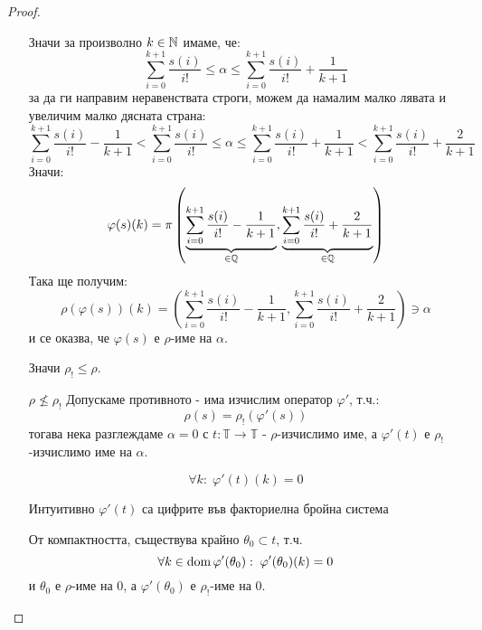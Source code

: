 \begin{proof}
\begin{itemize}
        Значи за произволно $k \in {\mathbb{N}}$ имаме, че:
        \begin{equation}
            \sum\limits_{i=0}^{k+1} \frac{s(i)}{i!} \leq \alpha \leq \sum\limits_{i=0}^{k+1} \frac{s(i)}{i!} + \frac{1}{k+1}
        \end{equation}
        за да ги направим неравенствата строги, можем да намалим малко лявата и увеличим малко дясната страна:
        \begin{equation}
            \sum\limits_{i=0}^{k+1} \frac{s(i)}{i!} - \frac{1}{k+1} < \sum\limits_{i=0}^{k+1} \frac{s(i)}{i!} \leq \alpha \leq \sum\limits_{i=0}^{k+1} \frac{s(i)}{i!} + \frac{1}{k+1} < \sum\limits_{i=0}^{k+1} \frac{s(i)}{i!} + \frac{2}{k+1}
        \end{equation}
        Значи:
        \begin{equation}
            \varphi(s)(k) = \pi\left(\underbrace{\sum\limits_{i=0}^{k+1} \frac{s(i)}{i!} - \frac{1}{k+1}}_{\in {\mathbb{Q}}}, \underbrace{\sum\limits_{i=0}^{k+1} \frac{s(i)}{i!} + \frac{2}{k+1}}_{\in{\mathbb{Q}}}\right)
        \end{equation}
        Така ще получим:
        \begin{equation}
            \rho(\varphi(s))(k) = \left(\sum\limits_{i=0}^{k+1} \frac{s(i)}{i!} - \frac{1}{k+1}, \sum\limits_{i=0}^{k+1} \frac{s(i)}{i!} + \frac{2}{k+1}\right) \ni \alpha
        \end{equation}
        и се оказва, че $\varphi(s)$ е $\rho$-име на $\alpha$.
    
        Значи $\rho_! \leq \rho$.
    
        \item[$\rho \nleq \rho_!$] Допускаме противното - има изчислим оператор $\varphi'$, т.ч.:
        \begin{equation}
            \rho(s) = \rho_!(\varphi'(s))
        \end{equation}
        тогава нека разглеждаме $\alpha = 0$ с $t: \mathbb T \to \mathbb T$ - $\rho$-изчислимо име, а $\varphi'(t)$ е $\rho_!$-изчислимо име на $\alpha$.
    
        \begin{equation}
            \forall k:\; \varphi'(t)(k) = 0
        \end{equation}

        Интуитивно $\varphi'(t)$ са цифрите във факториелна бройна система
    
        От компактността, съществува крайно $\theta_0 \subset t$, т.ч.
        \begin{equation}
            \forall k \in \operatorname*{dom}\varphi'(\theta_0):\; \varphi'(\theta_0)(k) = 0
        \end{equation}
        и $\theta_0$ е $\rho$-име на 0, а $\varphi'(\theta_0)$ е $\rho_!$-име на 0.
        

\end{itemize}
\end{proof}
